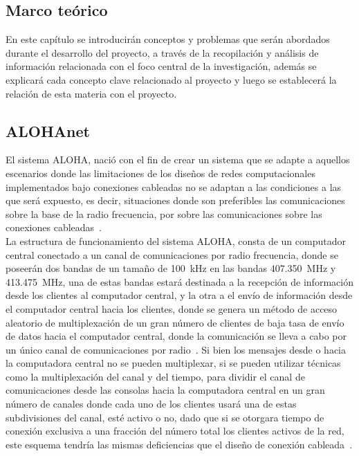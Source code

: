 \begin{justify}
\chapter[Marco teórico]{Marco teórico}
\label{ch:marcoteorico}
En este capítulo se introducirán conceptos y problemas que serán abordados durante el desarrollo del proyecto, a través de la recopilación y análisis de información relacionada con el foco central de la investigación, además se explicará cada concepto clave relacionado al proyecto y luego se establecerá la relación de esta materia con el proyecto.

\section{ALOHAnet}
El sistema ALOHA, nació con el fin de crear un sistema que se adapte a aquellos escenarios donde las limitaciones de los diseños de redes computacionales implementados bajo conexiones cableadas no se adaptan a las condiciones a las que será expuesto, es decir, situaciones donde son preferibles las comunicaciones sobre la base de la radio frecuencia, por sobre las comunicaciones sobre las conexiones cableadas~\cite{NORMAN}.\\
La estructura de funcionamiento del sistema ALOHA, consta de un computador central conectado a un canal de comunicaciones por radio frecuencia, donde se poseerán dos bandas de un tamaño de \SI{100}{\kilo\hertz} en las bandas \SI{407.350}{\mega\hertz} y \SI{413.475}{\mega\hertz}, una de estas bandas estará destinada a la recepción de información desde los clientes al computador central, y la otra a el envío de información desde el computador central hacia los clientes, donde se genera un método de acceso aleatorio de multiplexación de un gran número de clientes de baja tasa de envío de datos hacia el computador central, donde la comunicación se lleva a cabo por un único canal de comunicaciones por radio~\cite{NORMAN}. Si bien los mensajes desde o hacia la computadora central no se pueden multiplexar, si se pueden utilizar técnicas como la multiplexación del canal y del tiempo, para dividir el canal de comunicaciones desde las consolas hacia la computadora central en un gran número de canales donde cada uno de los clientes usará una de estas subdivisiones del canal, esté activo o no, dado que si se otorgara tiempo de conexión exclusiva a una fracción del número total los clientes activos de la red, este esquema tendría las mismas deficiencias que el diseño de conexión cableada~\cite{Abdullah}.\\

\end{justify}
